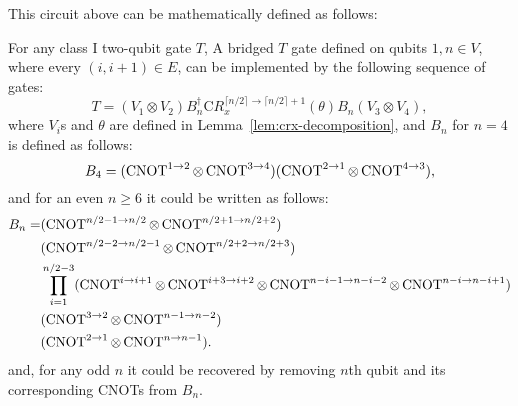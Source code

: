 This circuit above can be mathematically defined as follows:

\begin{proposition}\label{prop:bridged-class-i}
  For any class I two-qubit gate $T$, A bridged $T$ gate defined on qubits $1, n \in V$, where every $(i, i + 1) \in E$, can be implemented by the following sequence of gates:
  \begin{equation}
    T = (V_1 \otimes V_2) B^\dagger_n \mathrm{C}R_x^{\lceil n/2 \rceil \to \lceil n/2\rceil+1}(\theta) B_n (V_3 \otimes V_4),
  \end{equation}
  where $V_i$s and $\theta$ are defined in Lemma~\ref{lem:crx-decomposition}, and $B_n$ for $n = 4$ is defined as follows:
  \begin{equation}
    B_4 = (\operatorname{CNOT}^{1 \to 2} \otimes \operatorname{CNOT}^{3 \to 4}) (\operatorname{CNOT}^{2 \to 1} \otimes \operatorname{CNOT}^{4 \to 3}),
  \end{equation}
  and for an even $n \ge 6$ it could be written as follows:
  \begin{equation}
    \begin{aligned}
    B_{n} = &(\operatorname{CNOT}^{n/2 - 1 \to n/2} \otimes \operatorname{CNOT}^{n/2 + 1 \to n/2 + 2}) \\
    &(\operatorname{CNOT}^{n/2 - 2 \to n/2 - 1} \otimes \operatorname{CNOT}^{n/2 + 2 \to n/2 + 3}) \\
    &\prod_{i=1}^{n/2 - 3} (\operatorname{CNOT}^{i \to i+1} \otimes \operatorname{CNOT}^{i+3 \to i+2} \otimes \operatorname{CNOT}^{n-i-1 \to n-i-2} \otimes \operatorname{CNOT}^{n-i \to n-i+1}) \\
    &(\operatorname{CNOT}^{3 \to 2} \otimes \operatorname{CNOT}^{n-1 \to n-2}) \\
    &(\operatorname{CNOT}^{2 \to 1} \otimes \operatorname{CNOT}^{n \to n-1}).
    \end{aligned}
  \end{equation}
  and, for any odd $n$ it could be recovered by removing $n$th qubit and its corresponding CNOTs from $B_n$.
\end{proposition}
